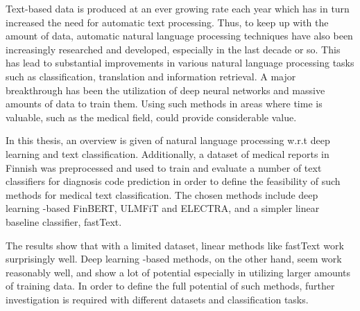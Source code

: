 \begin{abstracten}
Text-based data is produced at an ever growing rate each year which has in turn increased the need for automatic text processing.
Thus, to keep up with the amount of data, automatic natural language processing techniques have also been increasingly researched and developed, especially in the last decade or so.
This has lead to substantial improvements in various natural language processing tasks such as classification, translation and information retrieval.
A major breakthrough has been the utilization of deep neural networks and massive amounts of data to train them.
Using such methods in areas where time is valuable, such as the medical field, could provide considerable value.

In this thesis, an overview is given of natural language processing w.r.t deep learning and text classification.
Additionally, a dataset of medical reports in Finnish was preprocessed and used to train and evaluate a number of text classifiers for diagnosis code prediction in order to define the feasibility of such methods for medical text classification.
The chosen methods include deep learning -based FinBERT, ULMFiT and ELECTRA, and a simpler linear baseline classifier, fastText.

The results show that with a limited dataset, linear methods like fastText work surprisingly well.
Deep learning -based methods, on the other hand, seem work reasonably well, and show a lot of potential especially in utilizing larger amounts of training data.
In order to define the full potential of such methods, further investigation is required with different datasets and classification tasks.
\end{abstracten}
